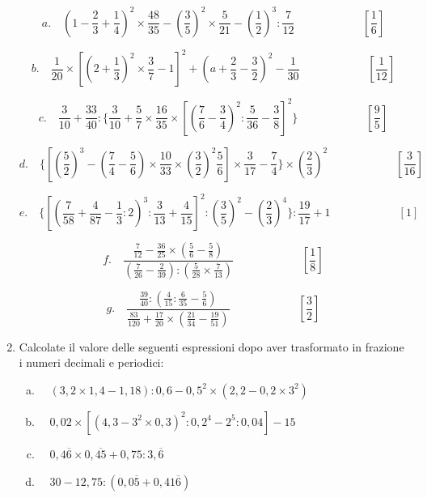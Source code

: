 \documentclass[]{article}
\newcommand*\result[1] {\hspace*{0em plus 1fill}{\footnotesize \makebox{[#1]}}}
\begin{document}
\begin{enumerate}
		\[a.\quad \left( 1-\frac23+\frac14 \right)^2\times\frac{48}{35}-\left(\frac35\right)^2\times\frac5{21}-\left(\frac12\right)^3:\frac7{12}\qquad\qquad\qquad\left[\frac16\right] \]
		
		\[b.\quad\frac1{20}\times\left[\left(2+\frac13\right)^2\times\frac37-1\right]^2+\left(a+\frac23-\frac32\right)^2-\frac1{30}\qquad\qquad\qquad\left[\frac1{12}\right]\]
		
		\[c.\quad\frac3{10}+\frac{33}{40}:\Bigg\{\frac3{10}+\frac57\times\frac{16}{35}\times\left[\left(\frac76-\frac34\right)^2:\frac5{36}-\frac38\right]^2\Bigg\}\qquad\qquad\qquad\left[\frac95\right]\]
		
		\[d.\quad\Bigg\{\left[\left(\frac52\right)^3-\left(\frac74-\frac56\right)\times\frac{10}{33}\times\left(\frac32\right)^2\frac56\right]\times\frac3{17}-\frac74\Bigg\}\times\left(\frac23\right)^2\qquad\qquad\qquad\left[\frac3{16}\right]\]
		
		\[e.\quad\Bigg\{\left[\left(\frac7{58}+\frac4{87}-\frac13:2\right)^3:\frac3{13}+\frac4{15}\right]^2:\left(\frac35\right)^2-\left(\frac23\right)^4\Bigg\}:\frac{19}{17}+1\qquad\qquad\qquad\left[1\right]\]
		
		\[f.\quad\frac{\frac7{12}-\frac{36}{25}\times\left(\frac56-\frac58\right)}{\left(\frac7{26}-\frac2{39}\right):\left(\frac5{28}\times\frac7{13}\right)}\qquad\qquad\qquad\left[\frac18\right]\]
		
		\[g.\quad\frac{\frac{39}{40}:\left(\frac4{15}:\frac6{35}-\frac56\right)}{\frac{83}{120}+\frac{17}{20}\times\left(\frac{21}{34}-\frac{19}{51}\right)}\qquad\qquad\qquad\left[\frac32\right]\]
		
		
		\item Calcolate il valore delle seguenti espressioni dopo aver trasformato in frazione i numeri decimali e periodici:
		
		\begin{enumerate}[a.]
			\item \(\quad(3,2\times1,4-1,18):0,6-0,5^2\times(2,2-0,2\times3^2)\) \result{\(\frac{27}5\)}
			
			\item \(\quad0,02\times[(4,3-3^2\times0,3)^2:0,2^4-2^5:0,04]-15\) \result{1}
			
			\item \(\quad0,4\overline{6}\times0,\overline{45}+0,75:3,\overline6\) \result{\(	\frac5{12}\)}
			
			\item \(\quad30-12,75:(0,0\overline5+0,41\overline6) \) \result{3}
		\end{enumerate}
		

\end{enumerate}
\end{document}
